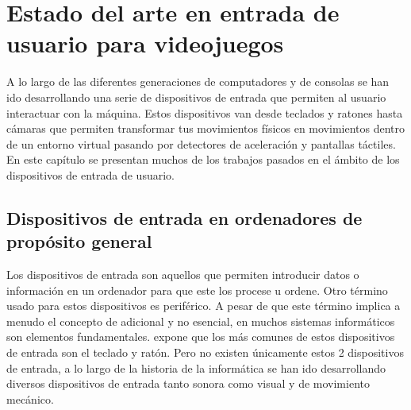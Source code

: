 %
%
%
%
%
%
%
%
%
%

\chapter{Estado del arte en entrada de usuario para videojuegos}
\label{cap2}


A lo largo de las diferentes generaciones de computadores y de consolas se han ido desarrollando una serie de dispositivos de entrada que permiten al usuario interactuar con la m\'aquina. Estos dispositivos van desde teclados y ratones hasta c\'amaras que permiten transformar tus movimientos f\'isicos en movimientos dentro de un entorno virtual pasando por detectores de aceleraci\'on y pantallas t\'actiles. En este cap\'itulo se presentan muchos de los trabajos pasados en el \'ambito de los dispositivos de entrada de usuario.
\section{Dispositivos de entrada en ordenadores de prop\'osito general}

Los dispositivos de entrada son aquellos que permiten introducir datos o informaci\'on en un ordenador para que este los procese u ordene. Otro t\'ermino usado para estos dispositivos es perif\'erico. A pesar de que este t\'ermino implica a menudo el concepto de adicional y no esencial, en muchos sistemas inform\'aticos son elementos fundamentales. \cite{entradasalida} expone que los m\'as comunes de estos dispositivos de entrada son el teclado y rat\'on. Pero no existen \'unicamente estos 2 dispositivos de entrada, a lo largo de la historia de la inform\'atica se han ido desarrollando diversos dispositivos de entrada tanto sonora como visual y de movimiento mec\'anico.\\

